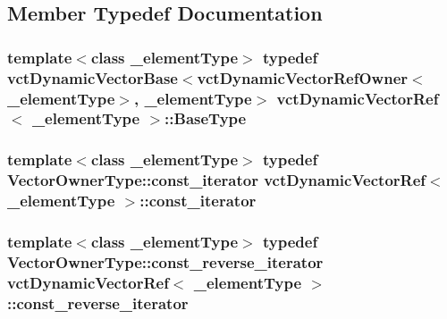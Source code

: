\subsection{Member Typedef Documentation}
\hypertarget{classvct_dynamic_vector_ref_acebe42b08620767155f3b769ce292163}{
\subsubsection[{Base\-Type}]{\setlength{\rightskip}{0pt plus 5cm}template$<$class \-\_\-element\-Type$>$ typedef {\bf vct\-Dynamic\-Vector\-Base}$<${\bf vct\-Dynamic\-Vector\-Ref\-Owner}$<$\-\_\-element\-Type$>$, \-\_\-element\-Type$>$ {\bf vct\-Dynamic\-Vector\-Ref}$<$ \-\_\-element\-Type $>$\-::{\bf Base\-Type}}}\label{classvct_dynamic_vector_ref_acebe42b08620767155f3b769ce292163}
\hypertarget{classvct_dynamic_vector_ref_a1ee3349f080cad407612465754d45c38}{
\subsubsection[{const\-\_\-iterator}]{\setlength{\rightskip}{0pt plus 5cm}template$<$class \-\_\-element\-Type$>$ typedef {\bf Vector\-Owner\-Type\-::const\-\_\-iterator} {\bf vct\-Dynamic\-Vector\-Ref}$<$ \-\_\-element\-Type $>$\-::{\bf const\-\_\-iterator}}}\label{classvct_dynamic_vector_ref_a1ee3349f080cad407612465754d45c38}
\hypertarget{classvct_dynamic_vector_ref_a9600a1990f185ffa4e5a58793a56e8af}{
\subsubsection[{const\-\_\-reverse\-\_\-iterator}]{\setlength{\rightskip}{0pt plus 5cm}template$<$class \-\_\-element\-Type$>$ typedef {\bf Vector\-Owner\-Type\-::const\-\_\-reverse\-\_\-iterator} {\bf vct\-Dynamic\-Vector\-Ref}$<$ \-\_\-element\-Type $>$\-::{\bf const\-\_\-reverse\-\_\-iterator}}}\label{classvct_dynamic_vector_ref_a9600a1990f185ffa4e5a58793a56e8af}
